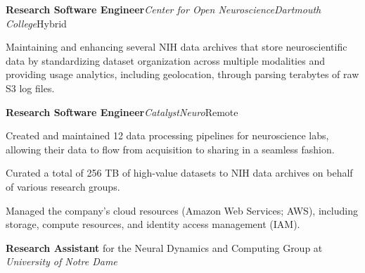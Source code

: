 \begin{rubric}{}
%
%
%
\entry*[2025 -- Present]
    \textbf{Research Software Engineer}\cvbar \emph{Center for Open Neuroscience}\cvbar \emph{Dartmouth College}\cvbar Hybrid
\begin{cvitems}
\item Maintaining and enhancing several NIH data archives that store neuroscientific data by standardizing dataset organization across multiple modalities and providing usage analytics, including geolocation, through parsing terabytes of raw S3 log files.
\end{cvitems}
%
%
%
\entry*[2020 -- 2024]
    \textbf{Research Software Engineer}\cvbar \emph{CatalystNeuro}\cvbar Remote
\begin{cvitems}
\item Created and maintained 12\raisebox{.3ex}{\scriptsize +} data processing pipelines for neuroscience labs, allowing their data to flow from acquisition to sharing in a seamless fashion.
\item Curated a total of 256 TB of high-value datasets to NIH data archives on behalf of various research groups.
\item Managed the company's cloud resources (Amazon Web Services; AWS), including storage, compute resources, and identity access management (IAM).
\end{cvitems}
%
%
%
\entry*[2016 -- 2020]
    \textbf{Research Assistant} for the Neural Dynamics and Computing Group at \emph{University of Notre Dame}
%
%
%
\end{rubric}
